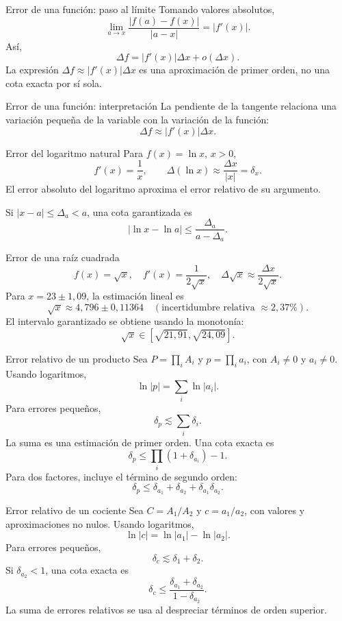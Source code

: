 \documentclass[main.tex]{subfiles}
\begin{document}
\begin{frame}{Error de una función: paso al límite}
Tomando valores absolutos,\[\lim_{a\to x}\frac{|f(a)-f(x)|}{|a-x|}=|f\prime(x)|.\]Así,\[\boxed{\Delta f=|f\prime(x)|\Delta x+o(\Delta x).}\]La expresión $\Delta f\approx|f\prime(x)|\Delta x$ es una aproximación de primer orden, no una cota exacta por sí sola.
\end{frame}

\begin{frame}{Error de una función: interpretación}
La pendiente de la tangente relaciona una variación pequeña de la variable con la variación de la función:\[\Delta f\approx|f\prime(x)|\Delta x.\]
\end{frame}

\begin{frame}{Error del logaritmo natural}
\small Para $f(x)=\ln x$, $x>0$,\[f\prime(x)=\frac1x,\qquad\Delta(\ln x)\approx\frac{\Delta x}{|x|}=\delta_x.\]El error absoluto del logaritmo aproxima el error relativo de su argumento.\par\medskip Si $|x-a|\le\Delta_a<a$, una cota garantizada es\[|\ln x-\ln a|\le\frac{\Delta_a}{a-\Delta_a}.\]
\end{frame}

\begin{frame}{Error de una raíz cuadrada}
\small\[f(x)=\sqrt x,\quad f\prime(x)=\frac1{2\sqrt x},\quad\Delta\sqrt x\approx\frac{\Delta x}{2\sqrt x}.\]Para $x=23\pm1{,}09$, la estimación lineal es\[\sqrt x\approx4{,}796\pm0{,}11364\quad(\text{incertidumbre relativa }\approx2{,}37\%).\]El intervalo garantizado se obtiene usando la monotonía:\[\sqrt x\in[\sqrt{21{,}91},\sqrt{24{,}09}].\]
\end{frame}

\begin{frame}{Error relativo de un producto}
\small Sea $P=\prod_i A_i$ y $p=\prod_i a_i$, con $A_i\ne0$ y $a_i\ne0$. Usando logaritmos,
\[\ln|p|=\sum_i\ln|a_i|.\]Para errores pequeños,\[\delta_p\lesssim\sum_i\delta_i.\]La suma es una estimación de primer orden. Una cota exacta es\[\boxed{\delta_p\le\prod_i(1+\delta_{a_i})-1.}\]Para dos factores, incluye el término de segundo orden:\[\delta_p\le\delta_{a_1}+\delta_{a_2}+\delta_{a_1}\delta_{a_2}.\]
\end{frame}

\begin{frame}{Error relativo de un cociente}
\small Sea $C=A_1/A_2$ y $c=a_1/a_2$, con valores y aproximaciones no nulos. Usando logaritmos,
\[\ln|c|=\ln|a_1|-\ln|a_2|.\]Para errores pequeños,\[\delta_c\lesssim\delta_1+\delta_2.\]Si $\delta_{a_2}<1$, una cota exacta es\[\boxed{\delta_c\le\frac{\delta_{a_1}+\delta_{a_2}}{1-\delta_{a_2}}.}\]La suma de errores relativos se usa al despreciar términos de orden superior.
\end{frame}
\end{document}
